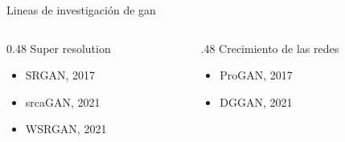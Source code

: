 \begin{frame}{Lineas de investigación de \gls{gan}}

    \begin{columns}[T]
    \begin{column}{0.48\textwidth}
    \alert{\Large Super resolution}
    \begin{itemize}
        \item SRGAN, 2017\cite{ledig2017photo}
        \item srcaGAN, 2021\cite{liu2021super}
        \item WSRGAN, 2021\cite{cao2021weighted}
    \end{itemize}
    \end{column}
    \hfill
    
    \begin{column}{.48\textwidth}
    \alert{\Large Crecimiento de las redes}
    \begin{itemize}
        \item ProGAN, 2017\cite{karras2017progressive}
        \item DGGAN, 2021\cite{liu2021dynamically}
    \end{itemize}
    \end{column}
    \end{columns}
    
\end{frame}


